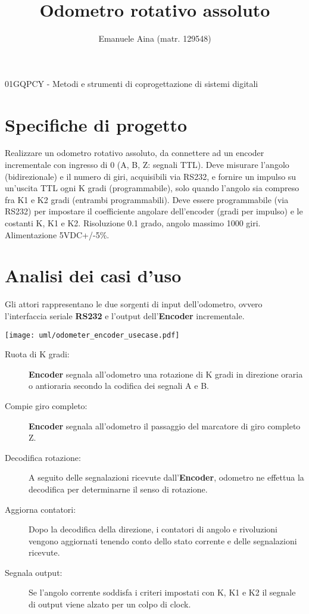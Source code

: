 \documentclass [11pt,a4paper,oneside]{paper}
\title{Odometro rotativo assoluto}
\author{Emanuele Aina (matr. 129548)}
\date{}
\newcommand{\actor}[1]{\textbf{#1}}
\newcommand{\component}[1]{\textbf{#1}}
\begin{document}
\maketitle

\small{01GQPCY - Metodi e strumenti di coprogettazione di sistemi digitali }

\vskip 1.5cm

\section{Specifiche di progetto}
Realizzare un odometro rotativo assoluto, da connettere ad un encoder
incrementale con ingresso di 0 (A, B, Z: segnali TTL). Deve misurare l'angolo
(bidirezionale) e il numero di giri, acquisibili via RS232, e fornire un
impulso su un'uscita TTL ogni K gradi (programmabile), solo quando l'angolo
sia compreso fra K1 e K2 gradi (entrambi programmabili). Deve essere
programmabile (via RS232) per impostare il coefficiente angolare dell'encoder
(gradi per impulso) e le costanti K, K1 e K2. Risoluzione 0.1 grado, angolo
massimo 1000 giri. Alimentazione 5VDC+/-5\%.

\section{Analisi dei casi d'uso}
Gli attori rappresentano le due sorgenti di input dell'odometro,
ovvero l'interfaccia seriale \component{RS232} e l'output
dell'\component{Encoder} incrementale.

\begin{center}
    \texttt{[image: uml/odometer\_encoder\_usecase.pdf]}
    \label{encoder_usecase}
\end{center}

\begin{description}
\item[Ruota di K gradi:] \actor{Encoder} segnala all'odometro una rotazione di
     K gradi in direzione oraria o antioraria secondo la codifica dei segnali A e B.
\item[Compie giro completo:] \actor{Encoder} segnala all'odometro il passaggio del
     marcatore di giro completo Z.
\item[Decodifica rotazione:] A seguito delle segnalazioni ricevute
     dall'\actor{Encoder}, odometro ne effettua la decodifica per determinarne
     il senso di rotazione.
\item[Aggiorna contatori:] Dopo la decodifica della direzione, i contatori di
     angolo e rivoluzioni vengono aggiornati tenendo conto dello stato corrente
     e delle segnalazioni ricevute.
\item[Segnala output:] Se l'angolo corrente soddisfa i criteri impostati con K, 
     K1 e K2 il segnale di output viene alzato per un colpo di clock.
\end{description}
\end{document}
